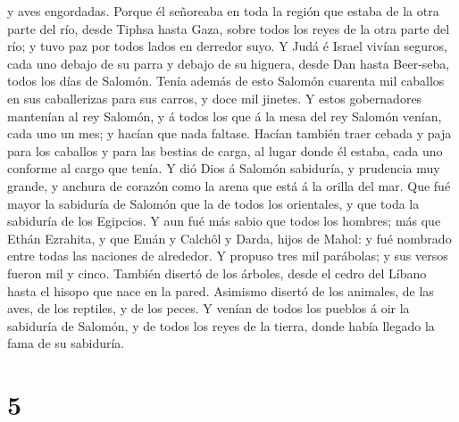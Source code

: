 y aves engordadas.  Porque él señoreaba en toda la región
que estaba de la otra parte del río, desde Tiphsa hasta Gaza, sobre
todos los reyes de la otra parte del río; y tuvo paz por todos lados en
derredor suyo.  Y Judá é Israel vivían seguros, cada uno
debajo de su parra y debajo de su higuera, desde Dan hasta Beer-seba,
todos los días de Salomón.  Tenía además de esto Salomón
cuarenta mil caballos en sus caballerizas para sus carros, y doce mil
jinetes.  Y estos gobernadores mantenían al rey Salomón,
y á todos los que á la mesa del rey Salomón venían, cada uno un mes; y
hacían que nada faltase.  Hacían también traer cebada y
paja para los caballos y para las bestias de carga, al lugar donde él
estaba, cada uno conforme al cargo que tenía.  Y dió Dios
á Salomón sabiduría, y prudencia muy grande, y anchura de corazón como
la arena que está á la orilla del mar.  Que fué mayor la
sabiduría de Salomón que la de todos los orientales, y que toda la
sabiduría de los Egipcios.  Y aun fué más sabio que todos
los hombres; más que Ethán Ezrahita, y que Emán y Calchôl y Darda, hijos
de Mahol: y fué nombrado entre todas las naciones de alrededor.
 Y propuso tres mil parábolas; y sus versos fueron mil y
cinco.  También disertó de los árboles, desde el cedro
del Líbano hasta el hisopo que nace en la pared. Asimismo disertó de los
animales, de las aves, de los reptiles, y de los peces. 
Y venían de todos los pueblos á oir la sabiduría de Salomón, y de todos
los reyes de la tierra, donde había llegado la fama de su sabiduría.

\hypertarget{section-4}{%
\section{5}\label{section-4}}


